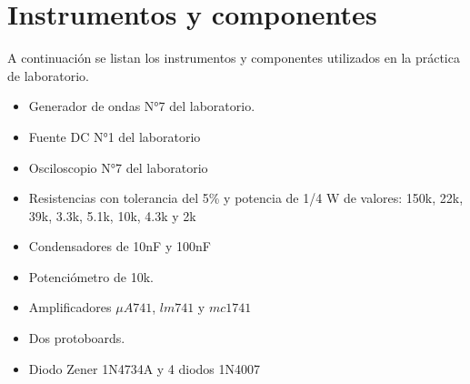 \section{Instrumentos y componentes}

A continuación se listan los instrumentos y componentes utilizados en la práctica de laboratorio.

\begin{itemize}
    \item Generador de ondas N°7 del laboratorio. 
    \item Fuente DC N°1 del laboratorio
    \item Osciloscopio N°7 del laboratorio
    \item Resistencias con tolerancia del 5\% y potencia de 1/4 W de valores: 150k, 22k, 39k, 3.3k, 5.1k, 10k, 4.3k y 2k
    \item Condensadores de 10nF y 100nF
    \item Potenciómetro de 10k.
    \item Amplificadores $\mu A741$, $lm741$ y $mc1741$
    \item Dos protoboards.
    \item Diodo Zener 1N4734A y 4 diodos 1N4007
\end{itemize}